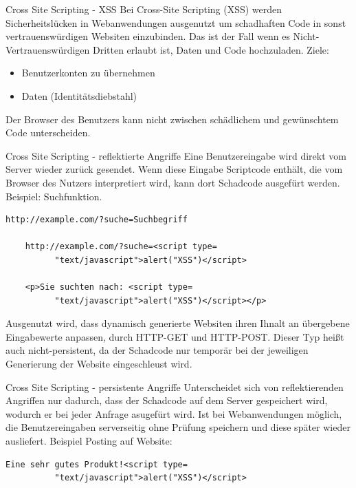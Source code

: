\documentclass[10pt]{beamer}
\begin{document}
\begin{frame}[fragile]{Cross Site Scripting - XSS}
  Bei Cross-Site Scripting (XSS) werden Sicherheitsl\"ucken in Webanwendungen ausgenutzt um schadhaften Code in sonst vertrauensw\"urdigen Websiten einzubinden.
  Das ist der Fall wenn es Nicht-Vertrauensw\"urdigen Dritten erlaubt ist, Daten und Code hochzuladen.
  \newline
  Ziele:
  \begin{itemize}
    \item Benutzerkonten zu \"ubernehmen
    \item Daten (Identit\"atsdiebstahl)
  \end{itemize}
  Der Browser des Benutzers kann nicht zwischen sch\"adlichem und gew\"unschtem Code unterscheiden.
\end{frame}

\begin{frame}[fragile]{Cross Site Scripting - reflektierte Angriffe}
  Eine Benutzereingabe wird direkt vom Server wieder zur\"uck gesendet.
  Wenn diese Eingabe Scriptcode enth\"alt, die vom Browser des Nutzers interpretiert wird, kann dort Schadcode ausgef\"urt werden.
  Beispiel: Suchfunktion.
  \begin{lstlisting}[style=CStyle]
    http://example.com/?suche=Suchbegriff

    http://example.com/?suche=<script type=
          "text/javascript">alert("XSS")</script>

    <p>Sie suchten nach: <script type=
          "text/javascript">alert("XSS")</script></p>
  \end{lstlisting}
  Ausgenutzt wird, dass dynamisch generierte Websiten ihren Ihnalt an \"ubergebene Eingabewerte anpassen, durch HTTP-GET und HTTP-POST.
  Dieser Typ hei{\ss}t auch nicht-persistent, da der Schadcode nur tempor\"ar bei der jeweiligen Generierung der Website eingeschleust wird.
\end{frame}

\begin{frame}[fragile]{Cross Site Scripting - persistente Angriffe}
  Unterscheidet sich von reflektierenden Angriffen nur dadurch, dass der Schadcode auf dem Server gespeichert wird, wodurch er bei jeder Anfrage asugef\"urt wird.
  Ist bei Webanwendungen m\"oglich, die Benutzereingaben serverseitig ohne Pr\"ufung speichern und diese sp\"ater wieder ausliefert.
  Beispiel Posting auf Website:
  \begin{lstlisting}[style=CStyle]
    Eine sehr gutes Produkt!<script type=
          "text/javascript">alert("XSS")</script>
  \end{lstlisting}
\end{frame}
\end{document}
